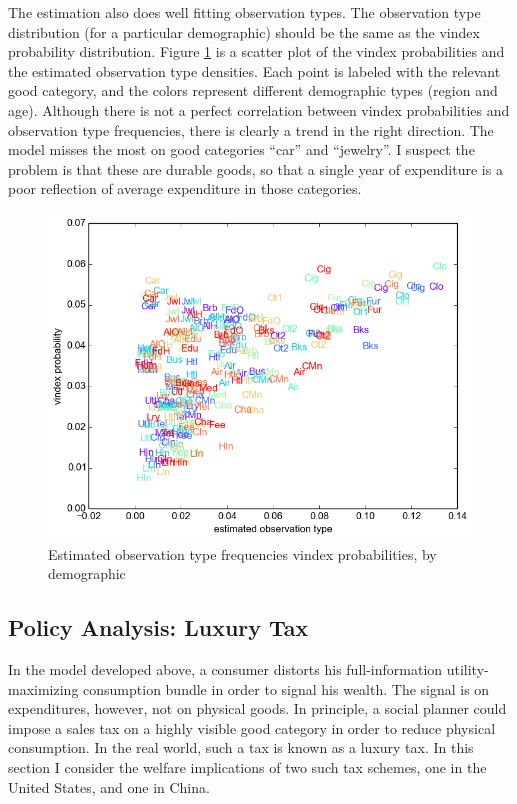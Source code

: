 The estimation also does well fitting observation types.
The observation type distribution (for a particular demographic) should be the same as the vindex probability distribution.
Figure \ref{fig:vinmatch} is a scatter plot of the vindex probabilities and the estimated observation type densities.  Each point is labeled with the relevant good category, and the colors represent different demographic types (region and age). Although there is not a perfect correlation between vindex probabilities and observation type frequencies, there is clearly a trend in the right direction.  The model misses the most on good categories ``car'' and ``jewelry''.  I suspect the problem is that these are durable goods, so that a single year of expenditure is a poor reflection of average expenditure in those categories.
\begin{figure}
    \centering
	\includegraphics[scale=.8]{pics/obs_vin_scat.png}
    \caption{Estimated observation type frequencies vindex probabilities, by demographic}
    \label{fig:vinmatch}
\end{figure}

\subsection{Policy Analysis: Luxury Tax}

In the model developed above, a consumer distorts his full-information utility-maximizing consumption bundle in order to signal his wealth.  The signal is on expenditures, however, not on physical goods.  In principle, a social planner could impose a sales tax on a highly visible good category in order to reduce physical consumption.  In the real world, such a tax is known as a luxury tax.  In this section I consider the welfare implications of two such tax schemes, one in the United States, and one in China.

